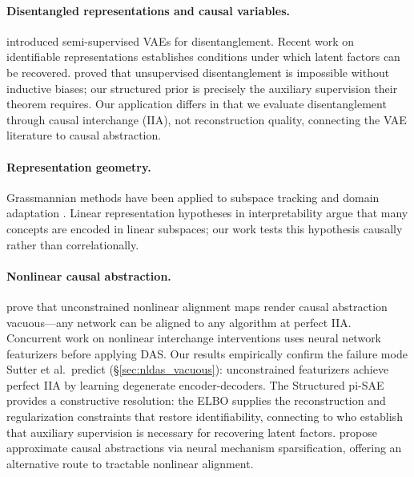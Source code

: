 \documentclass{article}
\begin{document}
\paragraph{Disentangled representations and causal variables.}
\citet{narayanaswamy2017learning} introduced semi-supervised VAEs for
disentanglement. Recent work on identifiable representations
\citep{khemakhem2020variational} establishes conditions under which latent
factors can be recovered. \citet{locatello2019challenging} proved that
unsupervised disentanglement is impossible without inductive biases; our
structured prior is precisely the auxiliary supervision their theorem
requires. Our application differs in that we evaluate
disentanglement through causal interchange (IIA), not reconstruction quality,
connecting the VAE literature to causal abstraction.

\paragraph{Representation geometry.}
Grassmannian methods have been applied to subspace tracking and domain adaptation
\citep{edelman1998geometry, gopalan2011domain}. Linear representation hypotheses
in interpretability \citep{marks2023geometry, engels2024language,
park2024linear} argue that many concepts are encoded in linear subspaces; our
work tests this hypothesis causally rather than correlationally.

\paragraph{Nonlinear causal abstraction.}
\citet{sutter2025nonlinear} prove that unconstrained nonlinear alignment maps
render causal abstraction vacuous---any network can be aligned to any algorithm
at perfect IIA. Concurrent work on nonlinear interchange interventions
\citep{geiger2024causal} uses neural network featurizers before applying DAS.
Our results empirically confirm the failure mode Sutter et al.\ predict
(\S\ref{sec:nldas_vacuous}): unconstrained featurizers achieve perfect IIA
by learning degenerate encoder-decoders. The Structured pi-SAE provides a
constructive resolution: the ELBO supplies the reconstruction and
regularization constraints that restore identifiability, connecting to
\citet{khemakhem2020variational, sutter2020multimodal} who establish that
auxiliary supervision is necessary for recovering latent factors.
\citet{li2025efficient} propose approximate causal abstractions via neural
mechanism sparsification, offering an alternative route to tractable nonlinear
alignment.
\end{document}
